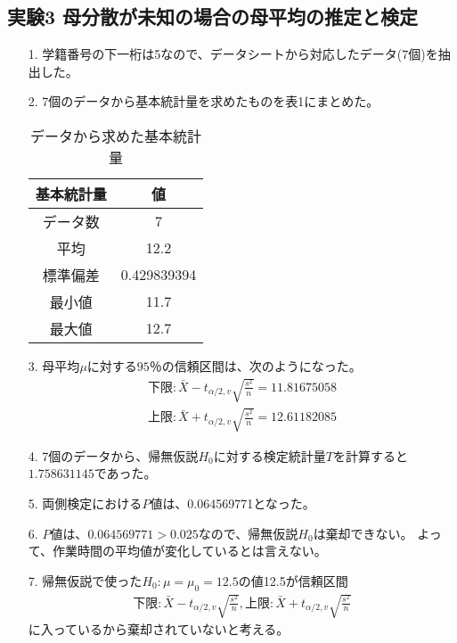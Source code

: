 \documentclass[12pt]{jarticle}
\begin{document}
\subsection{実験3 母分散が未知の場合の母平均の推定と検定}
\begin{itemize}
    \item [1.]学籍番号の下一桁は5なので、データシートから対応したデータ(7個)を抽出した。
    \item [2.]7個のデータから基本統計量を求めたものを表1にまとめた。
          \begin{table}[htb]
              \begin{center}
                  \caption{データから求めた基本統計量}
                  \begin{tabular}{|c|c|} \hline
                      基本統計量 & 値          \\ \hline
                      データ数   & 7           \\
                      平均       & 12.2        \\
                      標準偏差   & 0.429839394 \\
                      最小値     & 11.7        \\
                      最大値     & 12.7        \\\hline
                  \end{tabular}
              \end{center}
          \end{table}

    \item [3.]母平均$\mu$に対する$95％$の信頼区間は、次のようになった。
          \begin{eqnarray}
              下限:\bar{X}-t_{\alpha/2,v}\sqrt{\frac{s^2}{n}}=11.81675058 \nonumber \\
              上限:\bar{X}+t_{\alpha/2,v}\sqrt{\frac{s^2}{n}}=12.61182085 \nonumber
          \end{eqnarray}

    \item [4.]7個のデータから、帰無仮説$H_0$に対する検定統計量$T$を計算すると$1.758631145$であった。
    \item [5.]両側検定における$P値$は、0.064569771となった。
    \item [6.]$P値$は、$0.064569771>0.025$なので、帰無仮説$H_0$は棄却できない。
          よって、作業時間の平均値が変化しているとは言えない。
    \item [7.]帰無仮説で使った$H_0:\mu=\mu_0=12.5$の値12.5が信頼区間
          \begin{eqnarray}
              下限:\bar{X}-t_{\alpha/2,v}\sqrt{\frac{s^2}{n}},　上限:\bar{X}+t_{\alpha/2,v}\sqrt{\frac{s^2}{n}}\nonumber
          \end{eqnarray}
          に入っているから棄却されていないと考える。
\end{itemize}
\end{document}
